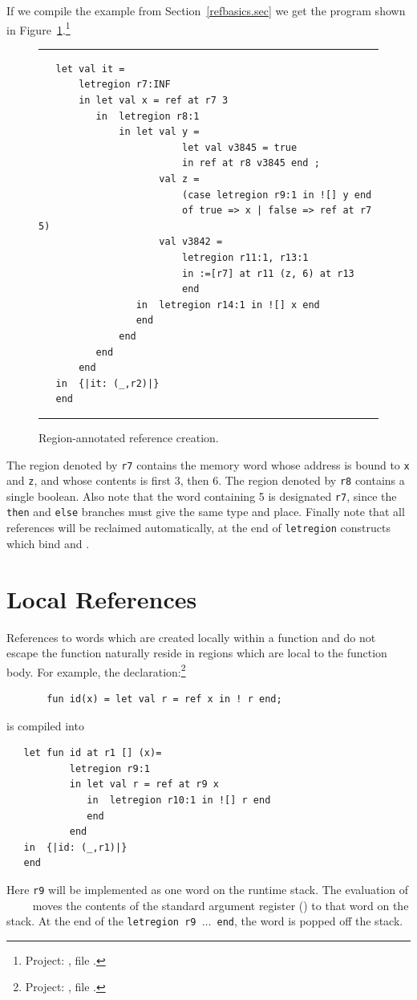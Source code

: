 \documentclass[12pt]{book}
\begin{document}
If we compile the example from Section~\ref{refbasics.sec} we get the 
program shown in Figure~\ref{otherrefs.fig}.\footnote{Project:
, file .}
\begin{figure}
\hrule
\begin{verbatim}
   let val it = 
       letregion r7:INF 
       in let val x = ref at r7 3
          in  letregion r8:1 
              in let val y = 
                         let val v3845 = true 
                         in ref at r8 v3845 end ; 
                     val z = 
                         (case letregion r9:1 in ![] y end 
                         of true => x | false => ref at r7 5)
                     val v3842 = 
                         letregion r11:1, r13:1 
                         in :=[r7] at r11 (z, 6) at r13 
                         end
                 in  letregion r14:1 in ![] x end
                 end  
              end
          end  
       end
   in  {|it: (_,r2)|}
   end 
\end{verbatim}
\caption{Region-annotated reference creation.}
\label{otherrefs.fig}
\medskip

\hrule
\end{figure}
The region denoted by {\tt r7} contains the memory 
word whose address is bound to {\tt x} and {\tt z},
and whose contents is first 3, then 6.  The region denoted
by {\tt r8} contains a single boolean.
Also note that the word containing 5 is
designated {\tt r7}, 
since the {\tt then} and {\tt else} branches must give the same
type and place. Finally note that all 
references will be reclaimed automatically,
at the end of {\tt letregion} constructs 
which bind  and .

\section{Local References}
References to words which are created locally within a function and do
not escape the function naturally reside in regions which are local to
the function body.
For example, the declaration:\footnote{Project: , file
.}
\begin{verbatim}
       fun id(x) = let val r = ref x in ! r end;
\end{verbatim}
is compiled into
\begin{verbatim}
   let fun id at r1 [] (x)= 
           letregion r9:1 
           in let val r = ref at r9 x
              in  letregion r10:1 in ![] r end
              end  
           end
   in  {|id: (_,r1)|}
   end 
\end{verbatim}
Here {\tt r9} will be implemented as one word on the runtime stack. The
evaluation of ~~~~ moves the contents of the standard
argument register () to that word on the stack. At the
end of the {\tt letregion r9 $\ldots$ end}, the word is popped off the stack.
\end{document}
